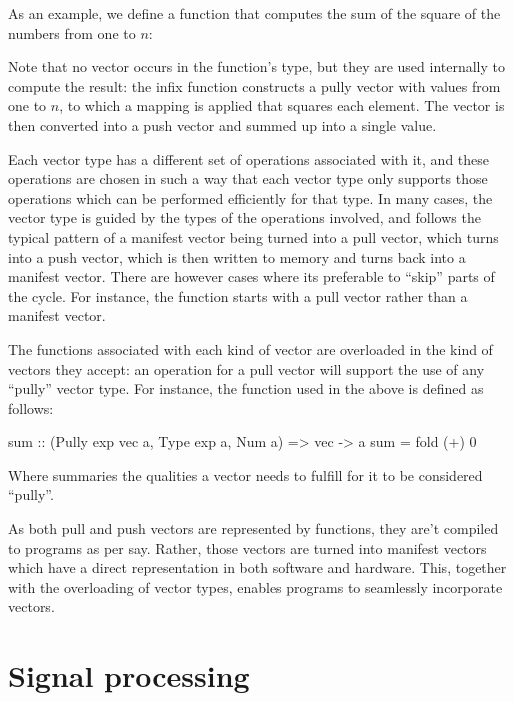 \documentclass[../paper.tex]{subfiles}
\begin{document}
As an example, we define a function that computes the sum of the square of the numbers from one to $n$:


\noindent Note that no vector occurs in the function's type, but they are used internally to compute the result: the infix function  constructs a pully vector with values from one to $n$, to which a mapping is applied that squares each element. The vector is then converted into a push vector and summed up into a single value.

Each vector type has a different set of operations associated with it, and these operations are chosen in such a way that each vector type only supports those operations which can be performed efficiently for that type. In many cases, the vector type is guided by the types of the operations involved, and follows the typical pattern of a manifest vector being turned into a pull vector, which turns into a push vector, which is then written to memory and turns back into a manifest vector. There are however cases where its preferable to ``skip'' parts of the cycle. For instance, the  function starts with a pull vector rather than a manifest vector.

The functions associated with each kind of vector are overloaded in the kind of vectors they accept: an operation for a pull vector will support the use of any ``pully'' vector type. For instance, the  function used in the above  is defined as follows:

\begin{code}
sum :: (Pully exp vec a, Type exp a, Num a) => vec -> a
sum = fold (+) 0
\end{code}

\noindent Where  summaries the qualities a vector needs to fulfill for it to be considered ``pully''.

As both pull and push vectors are represented by functions, they are't compiled to programs as per say. Rather, those vectors are turned into manifest vectors which have a direct representation in both software and hardware. This, together with the overloading of vector types, enables programs to seamlessly incorporate vectors.

\section{Signal processing}
\end{document}
